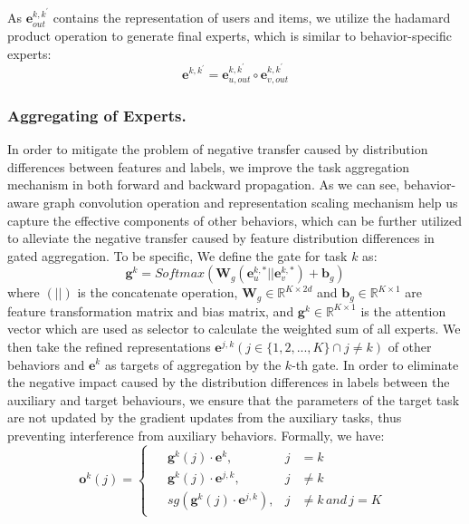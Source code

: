 As $\mathbf{e}_{out}^{k, k^{\prime}}$ contains the representation of users and items, we utilize the hadamard product operation to generate final experts, which is similar to behavior-specific experts:
\begin{equation}
\mathbf{e}^{k, k^{\prime}} = \mathbf{e}_{u,out}^{k, k^{\prime}} \circ \mathbf{e}_{v,out}^{k, k^{\prime}}
\end{equation}

\subsubsection{Aggregating of Experts.}
In order to mitigate the problem of negative transfer caused by distribution differences between features and labels, we improve the task aggregation mechanism in both forward and backward propagation. As we can see, behavior-aware graph convolution operation and representation scaling mechanism help us capture the effective components of other behaviors, which can be further utilized to alleviate the negative transfer caused by feature distribution differences in gated aggregation. To be specific, We define the gate for task $k$ as:
\begin{equation}
\mathbf{g}^k=Softmax(\mathbf{W}_g(\mathbf{e}_{u}^{k,*}||\mathbf{e}_{v}^{k,*})+\mathbf{b}_g)
\end{equation}
where $(||)$ is the concatenate operation, $\mathbf{W}_{g} \in \mathbb{R}^{K \times 2d}$ and $\mathbf{b}_{g} \in \mathbb{R}^{K \times 1}$ are feature transformation matrix and bias matrix, and $\mathbf{g}^{k} \in \mathbb{R}^{K \times 1}$ is the attention vector which are used as selector to calculate the weighted sum of all experts. We then take the refined representations $\mathbf{e}^{j, k} ( j \in \{1,2,...,K\} \cap j \neq k)$ of other behaviors and $\mathbf{e}^{k}$ as targets of aggregation by the $k$-th gate. In order to eliminate the negative impact caused by the distribution differences in labels between the auxiliary and target behaviours, we ensure that the parameters of the target task are not updated by the gradient updates from the auxiliary tasks, thus preventing interference from auxiliary behaviors. Formally, we have:
\begin{equation}
\mathbf{o}^{k}(j)=\left\{\begin{array}{c}
\begin{aligned}
& \mathbf{g}^{k}(j) \cdot \mathbf{e}^{k},& j& = k\\
& \mathbf{g}^{k}(j) \cdot \mathbf{e}^{j, k},& j&\neq k\\
& sg(\mathbf{g}^{k}(j) \cdot \mathbf{e}^{j, k}),& j&\neq k \,and\, j = K
\end{aligned}
\end{array}\right.
\end{equation}
